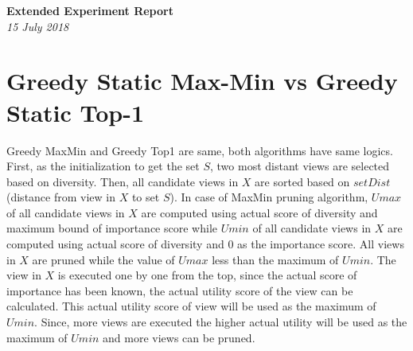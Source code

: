 \documentclass{article}
\begin{document}
\begin{titlepage}
	\begin{center}
		\Large\textbf{Extended Experiment Report}\\
		\large\textit{15 July 2018}
	\end{center}
\end{titlepage}

\section{Greedy Static Max-Min vs Greedy Static Top-1}

Greedy MaxMin and Greedy Top1 are same, both algorithms have same logics. First, as the initialization to get the set $ S $, two most distant views are selected based on diversity. Then, all candidate views in $ X $ are sorted based on $ setDist $ (distance from view in $ X $ to set $ S $). 
In case of MaxMin pruning algorithm, $ Umax $ of all candidate views in $ X $ are computed using actual score of diversity and maximum bound of importance score while $ Umin $ of all candidate views in $ X $ are computed using actual score of diversity and $ 0 $ as the importance score. All views in $ X $ are pruned while the value of $ Umax $ less than the maximum of $ Umin $. The view in $ X $ is executed one by one from the top, since the actual score of importance has been known, the actual utility score of the view can be calculated. This actual utility score of view will be used as the maximum of $ Umin $. Since, more views are executed the higher actual utility will be used as the maximum of $ Umin $ and more views can be pruned. 
\end{document}
